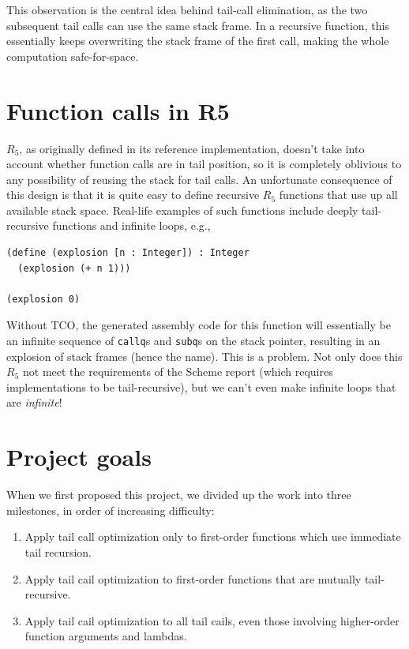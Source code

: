 \documentclass[12pt]{article}
\begin{document}
This observation is the central idea behind tail-call elimination,
as the two subsequent tail calls can use the same stack frame. In a
recursive function, this essentially keeps overwriting the stack frame
of the first call, making the whole computation safe-for-space.

\section{Function calls in R5}
$R_5$, as originally defined in its reference implementation, doesn't take into
account whether function calls are in tail position, so it is completely oblivious to
any possibility of reusing the stack for tail calls. An unfortunate consequence of this design
is that it is quite easy to define recursive $R_5$ functions that use up all available
stack space. Real-life examples of such functions include deeply tail-recursive functions
and infinite loops, e.g.,

\begin{verbatim}
(define (explosion [n : Integer]) : Integer
  (explosion (+ n 1)))

(explosion 0)
\end{verbatim}

Without TCO, the generated assembly code for this function
will essentially be an infinite sequence of
\verb+callq+s and \verb+subq+s on the stack pointer, resulting in an
explosion of stack frames (hence the name). This is a problem. Not only does this
$R_5$ not meet the requirements of the Scheme report (which requires implementations
to be tail-recursive), but we can't even make infinite loops that are \emph{infinite}!

\section{Project goals}

When we first proposed this project, we divided up the work into three milestones,
in order of increasing difficulty:

\begin{enumerate}
 \item Apply tail call optimization only to first-order functions which use
       immediate tail recursion.
 \item Apply tail cail optimization to first-order functions that are mutually
       tail-recursive.
 \item  Apply tail cail optimization to all tail cails, even those involving
        higher-order function arguments and lambdas.
\end{enumerate}
\end{document}
